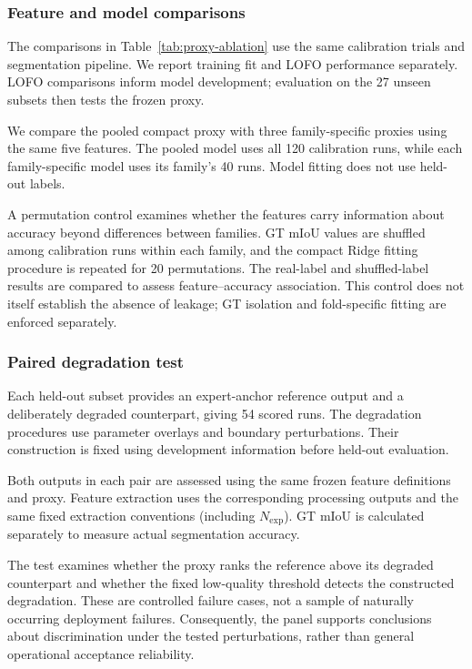 \documentclass[a4paper,fleqn]{cas-dc}
\begin{document}
{\subsubsection{Feature and model comparisons}
\label{sec:comparators}

The comparisons in Table~\ref{tab:proxy-ablation} use the same calibration trials and segmentation pipeline. We report training fit and LOFO performance separately. LOFO comparisons inform model development; evaluation on the 27 unseen subsets then tests the frozen proxy.

We compare the pooled compact proxy with three family-specific proxies using the same five features. The pooled model uses all 120 calibration runs, while each family-specific model uses its family's 40 runs. Model fitting does not use held-out labels.

A permutation control examines whether the features carry information about accuracy beyond differences between families. GT mIoU values are shuffled among calibration runs within each family, and the compact Ridge fitting procedure is repeated for 20 permutations. The real-label and shuffled-label results are compared to assess feature--accuracy association. This control does not itself establish the absence of leakage; GT isolation and fold-specific fitting are enforced separately.


\subsubsection{Paired degradation test}
\label{sec:stress-test}

Each held-out subset provides an expert-anchor reference output and a deliberately degraded counterpart, giving 54 scored runs. The degradation procedures use parameter overlays and boundary perturbations. Their construction is fixed using development information before held-out evaluation.

Both outputs in each pair are assessed using the same frozen feature definitions and proxy. Feature extraction uses the corresponding processing outputs and the same fixed extraction conventions (including $N_{\mathrm{exp}}$). GT mIoU is calculated separately to measure actual segmentation accuracy.

The test examines whether the proxy ranks the reference above its degraded counterpart and whether the fixed low-quality threshold detects the constructed degradation. These are controlled failure cases, not a sample of naturally occurring deployment failures. Consequently, the panel supports conclusions about discrimination under the tested perturbations, rather than general operational acceptance reliability.


}
\end{document}
